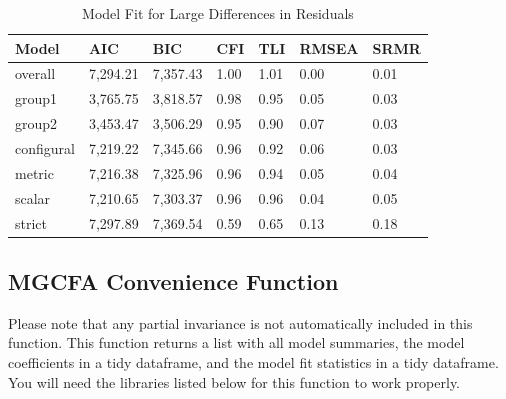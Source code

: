 \documentclass[
  man]{apa6}
\begin{document}
\begin{table}[tbp]

\begin{center}
\begin{threeparttable}

\caption{\label{tab:tab10}Model Fit for Large Differences in Residuals}

\begin{tabular}{lllllll}
\toprule
Model & AIC & BIC & CFI & TLI & RMSEA & SRMR\\
\midrule
overall & 7,294.21 & 7,357.43 & 1.00 & 1.01 & 0.00 & 0.01\\
group1 & 3,765.75 & 3,818.57 & 0.98 & 0.95 & 0.05 & 0.03\\
group2 & 3,453.47 & 3,506.29 & 0.95 & 0.90 & 0.07 & 0.03\\
configural & 7,219.22 & 7,345.66 & 0.96 & 0.92 & 0.06 & 0.03\\
metric & 7,216.38 & 7,325.96 & 0.96 & 0.94 & 0.05 & 0.04\\
scalar & 7,210.65 & 7,303.37 & 0.96 & 0.96 & 0.04 & 0.05\\
strict & 7,297.89 & 7,369.54 & 0.59 & 0.65 & 0.13 & 0.18\\
\bottomrule
\end{tabular}

\end{threeparttable}
\end{center}

\end{table}

\hypertarget{mgcfa-convenience-function}{%
\subsection{MGCFA Convenience Function}\label{mgcfa-convenience-function}}

Please note that any partial invariance is not automatically included in this function. This function returns a list with all model summaries, the model coefficients in a tidy dataframe, and the model fit statistics in a tidy dataframe. You will need the libraries listed below for this function to work properly.

\small
\end{document}
